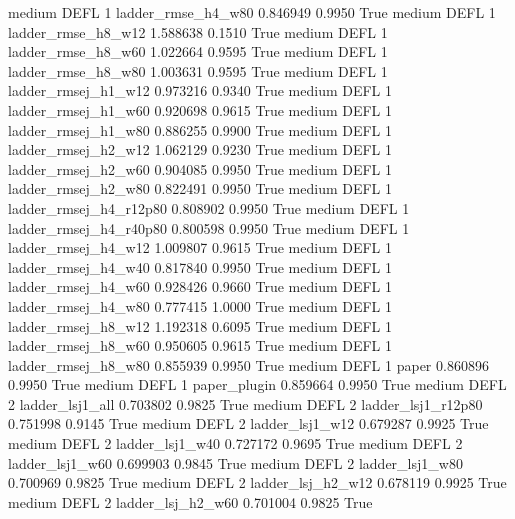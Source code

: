     medium     DEFL                 1     ladder_rmse_h4_w80   0.846949      0.9950    True
    medium     DEFL                 1     ladder_rmse_h8_w12   1.588638      0.1510    True
    medium     DEFL                 1     ladder_rmse_h8_w60   1.022664      0.9595    True
    medium     DEFL                 1     ladder_rmse_h8_w80   1.003631      0.9595    True
    medium     DEFL                 1    ladder_rmsej_h1_w12   0.973216      0.9340    True
    medium     DEFL                 1    ladder_rmsej_h1_w60   0.920698      0.9615    True
    medium     DEFL                 1    ladder_rmsej_h1_w80   0.886255      0.9900    True
    medium     DEFL                 1    ladder_rmsej_h2_w12   1.062129      0.9230    True
    medium     DEFL                 1    ladder_rmsej_h2_w60   0.904085      0.9950    True
    medium     DEFL                 1    ladder_rmsej_h2_w80   0.822491      0.9950    True
    medium     DEFL                 1 ladder_rmsej_h4_r12p80   0.808902      0.9950    True
    medium     DEFL                 1 ladder_rmsej_h4_r40p80   0.800598      0.9950    True
    medium     DEFL                 1    ladder_rmsej_h4_w12   1.009807      0.9615    True
    medium     DEFL                 1    ladder_rmsej_h4_w40   0.817840      0.9950    True
    medium     DEFL                 1    ladder_rmsej_h4_w60   0.928426      0.9660    True
    medium     DEFL                 1    ladder_rmsej_h4_w80   0.777415      1.0000    True
    medium     DEFL                 1    ladder_rmsej_h8_w12   1.192318      0.6095    True
    medium     DEFL                 1    ladder_rmsej_h8_w60   0.950605      0.9615    True
    medium     DEFL                 1    ladder_rmsej_h8_w80   0.855939      0.9950    True
    medium     DEFL                 1                  paper   0.860896      0.9950    True
    medium     DEFL                 1           paper_plugin   0.859664      0.9950    True
    medium     DEFL                 2        ladder_lsj1_all   0.703802      0.9825    True
    medium     DEFL                 2     ladder_lsj1_r12p80   0.751998      0.9145    True
    medium     DEFL                 2        ladder_lsj1_w12   0.679287      0.9925    True
    medium     DEFL                 2        ladder_lsj1_w40   0.727172      0.9695    True
    medium     DEFL                 2        ladder_lsj1_w60   0.699903      0.9845    True
    medium     DEFL                 2        ladder_lsj1_w80   0.700969      0.9825    True
    medium     DEFL                 2      ladder_lsj_h2_w12   0.678119      0.9925    True
    medium     DEFL                 2      ladder_lsj_h2_w60   0.701004      0.9825    True
